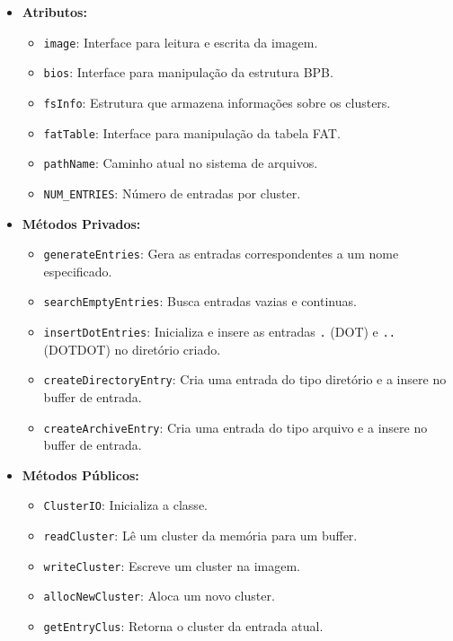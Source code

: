\documentclass[
    12pt,				%
    oneside,   	        %
    a4paper,			%
    english,			%
    french,				%
    spanish,			%
    brazil,				%
    ]{pacotes/abntex2}
\begin{document}
\begin{itemize}
    \item \textbf{Atributos:}
        \begin{itemize}
            \item \texttt{image}: Interface para leitura e escrita da imagem.
            \item \texttt{bios}: Interface para manipulação da estrutura BPB.
            \item \texttt{fsInfo}: Estrutura que armazena informações sobre os clusters.
            \item \texttt{fatTable}: Interface para manipulação da tabela FAT.
            \item \texttt{pathName}: Caminho atual no sistema de arquivos.
            \item \texttt{NUM\_ENTRIES}: Número de entradas por cluster.
        \end{itemize}
    \item \textbf{Métodos Privados:}
        \begin{itemize}
            \item \texttt{generateEntries}: Gera as entradas correspondentes a um nome especificado.
            \item \texttt{searchEmptyEntries}: Busca entradas vazias e continuas.
            \item \texttt{insertDotEntries}: Inicializa e insere as entradas \texttt{.} (DOT) e \texttt{..} (DOTDOT) no diretório criado.
            \item \texttt{createDirectoryEntry}: Cria uma entrada do tipo diretório e a insere no buffer de entrada.
            \item \texttt{createArchiveEntry}: Cria uma entrada do tipo arquivo e a insere no buffer de entrada.
        \end{itemize}
    \item \textbf{Métodos Públicos:}
        \begin{itemize}
            \item \texttt{ClusterIO}: Inicializa a classe.
            \item \texttt{readCluster}: Lê um cluster da memória para um buffer.
            \item \texttt{writeCluster}: Escreve um cluster na imagem.
            \item \texttt{allocNewCluster}: Aloca um novo cluster.
            \item \texttt{getEntryClus}: Retorna o cluster da entrada atual.

\end{itemize}
\end{itemize}
\end{document}
